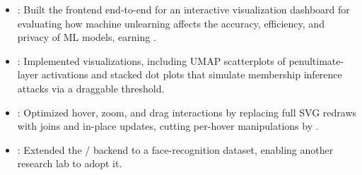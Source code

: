 \begin{itemize}
  \item {}: Built the frontend end-to-end for an interactive visualization dashboard for evaluating how machine unlearning affects the accuracy, efficiency, and privacy of ML models, earning .
  \item {}: Implemented  visualizations, including  UMAP scatterplots of penultimate-layer activations and  stacked dot plots that simulate membership inference attacks via a draggable threshold.
  \item {}: Optimized hover, zoom, and drag interactions by replacing full SVG redraws with  joins and in-place updates, cutting per-hover  manipulations by .
  \item {}: Extended the / backend to a face-recognition dataset, enabling another research lab to adopt it.
\end{itemize}
